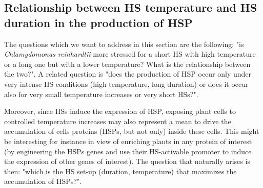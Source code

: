 \documentclass[oneside, 10pt, a4paper, twocolumn]{article}
\begin{document}
\subsection{{Relationship} between HS temperature and HS duration in the production of HSP}
\label{SecTradeOff}



The questions which we want to address in this section  
are the following: "is \emph{Chlamydomonas reinhardtii} more stressed for a short HS with high temperature or a long one but with a lower temperature? What is the {relationship} between the two?". A related question is "does the production of HSP {occur} only under very intense HS conditions (high temperature, long duration) or does it {occur} also for very small temperature increases or very short HSs?". 

{Moreover, since HSs induce the expression of HSP, exposing plant cells to controlled temperature increases may also represent a mean to drive the accumulation of cells proteins (HSPs, but not only) inside these cells.} This might be interesting for instance in view of enriching plants in any protein of interest (by engineering the HSPs genes and use their HS-activable promoter to induce the expression of other genes of interest). 
The question that naturally arises is then: "which is the HS set-up (duration, temperature) that maximizes the accumulation of HSPs?".

\end{document}
